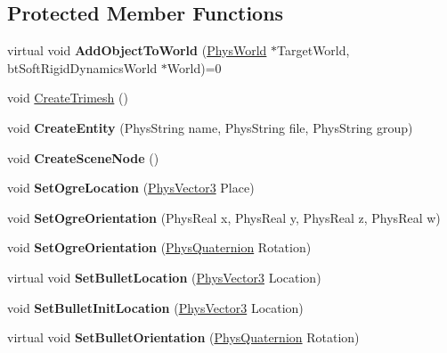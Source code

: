 \subsection*{Protected Member Functions}
\begin{DoxyCompactItemize}
\item 
\hypertarget{classActorBase_a1af82a2ed960fd114518fdf84d5ff146}{
virtual void {\bfseries AddObjectToWorld} (\hyperlink{classPhysWorld}{PhysWorld} $\ast$TargetWorld, btSoftRigidDynamicsWorld $\ast$World)=0}
\label{dd/d7b/classActorBase_a1af82a2ed960fd114518fdf84d5ff146}

\item 
void \hyperlink{classActorBase_af7f0806222c79b5d5120dccefd93715e}{CreateTrimesh} ()
\item 
\hypertarget{classActorBase_aa87583c47b8653e8ac7d96f1481b57fd}{
void {\bfseries CreateEntity} (PhysString name, PhysString file, PhysString group)}
\label{dd/d7b/classActorBase_aa87583c47b8653e8ac7d96f1481b57fd}

\item 
\hypertarget{classActorBase_a168cd57e20b2adfc5cae21627ddbae31}{
void {\bfseries CreateSceneNode} ()}
\label{dd/d7b/classActorBase_a168cd57e20b2adfc5cae21627ddbae31}

\item 
\hypertarget{classActorBase_a3140cc5c1c630efc1c04c20ada319b8b}{
void {\bfseries SetOgreLocation} (\hyperlink{classPhysVector3}{PhysVector3} Place)}
\label{dd/d7b/classActorBase_a3140cc5c1c630efc1c04c20ada319b8b}

\item 
\hypertarget{classActorBase_a64ec1d0987bb32070e0c686db3b06e56}{
void {\bfseries SetOgreOrientation} (PhysReal x, PhysReal y, PhysReal z, PhysReal w)}
\label{dd/d7b/classActorBase_a64ec1d0987bb32070e0c686db3b06e56}

\item 
\hypertarget{classActorBase_a55f45703e3d9b8de0cd07b23bd9460bf}{
void {\bfseries SetOgreOrientation} (\hyperlink{classPhysQuaternion}{PhysQuaternion} Rotation)}
\label{dd/d7b/classActorBase_a55f45703e3d9b8de0cd07b23bd9460bf}

\item 
\hypertarget{classActorBase_af64a57138bbd32c52581a5c8d0d29a76}{
virtual void {\bfseries SetBulletLocation} (\hyperlink{classPhysVector3}{PhysVector3} Location)}
\label{dd/d7b/classActorBase_af64a57138bbd32c52581a5c8d0d29a76}

\item 
\hypertarget{classActorBase_af52177760d530df2b0987ed8626a656d}{
void {\bfseries SetBulletInitLocation} (\hyperlink{classPhysVector3}{PhysVector3} Location)}
\label{dd/d7b/classActorBase_af52177760d530df2b0987ed8626a656d}

\item 
\hypertarget{classActorBase_adf817bd5a7c562f31f6724a06a3a0f79}{
virtual void {\bfseries SetBulletOrientation} (\hyperlink{classPhysQuaternion}{PhysQuaternion} Rotation)}
\label{dd/d7b/classActorBase_adf817bd5a7c562f31f6724a06a3a0f79}

\end{DoxyCompactItemize}

